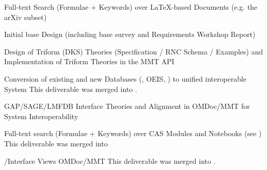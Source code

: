 \begin{workpackage}[id=dksbases,%
  title=Data/Knowledge/Software-Bases,lead=FAU,
  ZHRM=12,JURM=12,FAURM=34,UWRM=25,SARM=10,LLRM=2,PSRM=25]
\begin{wpdelivs}
\begin{wpdeliv}[id=mws,miles=startup,due=9,nature=OTHER,dissem=PU,lead=JU,issue=133, status=delivered]
    {Full-text Search (Formulae + Keywords) over LaTeX-based Documents
      (e.g. the arXiv subset)}
  \end{wpdeliv}
  \begin{wpdeliv}[due=12,miles=startup,id=design,dissem=PU,nature=R,lead=JU,issue=136, status=delivered]
    {Initial \DKS base Design (including base survey and Requirements Workshop Report)}
  \end{wpdeliv}
  \begin{wpdeliv}[due=15,miles=proto1,id=dkstheories,dissem=PU,nature=R,lead=JU,issue=137, status=delivered]
    {Design of Triform (DKS) Theories (Specification / RNC Sche\-ma / Examples) and 
      Implementation of Triform Theories in the MMT API}
  \end{wpdeliv}
  \begin{wpdeliv}[due=24,id=conv,dissem=PU,nature=DEC,lead=ZH,issue=138,status=canceled]
    {Conversion of existing and new Databases (\LMFDB, OEIS, \FindStat) to unified interoperable
      System}
    This deliverable was merged into .
  \end{wpdeliv}
  \begin{wpdeliv}[due=24,id=psfoundation,dissem=PU,nature=OTHER,lead=FAU,issue=139]
    {GAP/SAGE/LMFDB Interface Theories and Alignment in OMDoc/MMT for
      System Interoperability}
  \end{wpdeliv}
  \begin{wpdeliv}[id=notebooksearch,due=30,nature=OTHER,dissem=PU,lead=FAU,issue=140,status=canceled]
    {Full-text search (Formulae + Keywords) over CAS Modules and Notebooks} (see
      )
    This deliverable was merged into 
  \end{wpdeliv}
  \begin{wpdeliv}[due=36,id=pssem,dissem=PU,nature=OTHER,lead=FAU,issue=141,status=canceled]
    {\GAP/\Sage Interface Views OMDoc/MMT}
    This deliverable was merged into .
  \end{wpdeliv}

\end{wpdelivs}
\end{workpackage}
